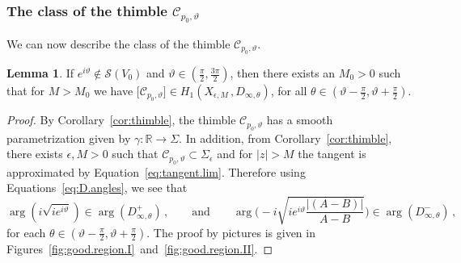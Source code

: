 \documentclass[12pt,reqno]{amsart}
\theoremstyle{definition}
\newtheorem{lemma}[theorem]{Lemma}
\def\BR{\mathbb R}
\def\calC{\mathcal C}
\def\Re{\mathrm{Re}}
\def\Im{\mathrm{Im}}
\def\be{\begin{equation}}
\def\ee{\end{equation}}
\renewcommand{\=}{\;=\;}
\begin{document}
\subsubsection{The class of the thimble $\calC_{p_0,\vartheta}$}
We can now describe the class of the thimble $\mathcal{C}_{p_0,\vartheta}$.
\begin{lemma}\label{lem:class-thimble}
If $ e^{i\vartheta}\notin\mathcal{S}(V_0)$ and $\vartheta\in(\tfrac{\pi}{2},\tfrac{3\pi}{2})$, then there exists an $M_0>0$ such that for $M>M_0$ we have $\big[\mathcal{C}_{p_0,\vartheta}\big]\in H_1(X_{\epsilon,M}\,,D_{\infty,\theta})$, for all $\theta\in(\vartheta-\tfrac{\pi}{2},\vartheta+\tfrac{\pi}{2})$.
\end{lemma}
\begin{proof}
By Corollary~\ref{cor:thimble}, the thimble $\mathcal{C}_{p_0,\vartheta}$ has a smooth parametrization given by $\gamma\colon\BR\to\Sigma$. In addition, from Corollary~\ref{cor:thimble}, there exists $\epsilon, M>0$ such that $\mathcal{C}_{p_0,\vartheta}\subset\Sigma_\epsilon$ and for $|z|>M$ the tangent is approximated by Equation~\eqref{eq:tangent.lim}. Therefore using Equations~\eqref{eq:D.angles}, we see that
\be
  \arg(i\sqrt{ie^{i\vartheta}})\in\arg(D_{\infty,\theta}^{+})\,,
  \qquad\text{and}\qquad
 \arg\Big(-i\sqrt{ie^{i\vartheta}\frac{|(A-B)|}{A-B}}\Big)\in\arg(D_{\infty,\theta}^{-})\,,
\ee
for each $\theta\in(\vartheta-\tfrac{\pi}{2},\vartheta+\tfrac{\pi}{2})$. The proof by pictures is given in Figures~\ref{fig:good.region.I}~and~\ref{fig:good.region.II}.

\end{proof}
\end{document}
